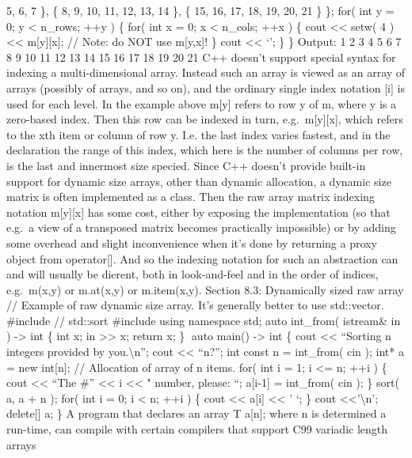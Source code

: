 5, 6, 7 \}, \{ 8, 9, 10, 11, 12, 13, 14 \}, \{ 15, 16, 17, 18, 19, 20,
21 \} \}; for( int y = 0; y \textless{} n\_rows; ++y ) \{ for( int x =
0; x \textless{} n\_cols; ++x ) \{ cout \textless\textless{} setw( 4 )
\textless\textless{} m{[}y{]}{[}x{]}; // Note: do NOT use m{[}y,x{]}! \}
cout \textless\textless{} `\n'; \} \} Output: 1 2 3 4 5 6 7 8 9 10 11 12
13 14 15 16 17 18 19 20 21 C++ doesn't support special syntax for
indexing a multi-dimensional array. Instead such an array is viewed as
an array of arrays (possibly of arrays, and so on), and the ordinary
single index notation {[}i{]} is used for each level. In the example
above m{[}y{]} refers to row y of m, where y is a zero-based index. Then
this row can be indexed in turn, e.g.~m{[}y{]}{[}x{]}, which refers to
the xth item or column of row y. I.e. the last index varies fastest, and
in the declaration the range of this index, which here is the number of
columns per row, is the last and innermost size specied. Since C++
doesn't provide built-in support for dynamic size arrays, other than
dynamic allocation, a dynamic size matrix is often implemented as a
class. Then the raw array matrix indexing notation m{[}y{]}{[}x{]} has
some cost, either by exposing the implementation (so that e.g.~a view of
a transposed matrix becomes practically impossible) or by adding some
overhead and slight inconvenience when it's done by returning a proxy
object from operator{[}{]}. And so the indexing notation for such an
abstraction can and will usually be dierent, both in look-and-feel and
in the order of indices, e.g.~m(x,y) or m.at(x,y) or m.item(x,y).
Section 8.3: Dynamically sized raw array // Example of raw dynamic size
array. It's generally better to use std::vector. \#include // std::sort
\#include using namespace std; auto int\_from( istream\& in )
-\textgreater{} int \{ int x; in \textgreater\textgreater{} x; return x;
\} auto main() -\textgreater{} int \{ cout \textless\textless{}
``Sorting n integers provided by you.\textbackslash n''; cout
\textless\textless{} ``n?''; int const n = int\_from( cin ); int* a =
new int{[}n{]}; // Allocation of array of n items. for( int i = 1; i
\textless= n; ++i ) \{ cout \textless\textless{} ``The \#''
\textless\textless{} i \textless\textless{} " number, please: ``;
a{[}i-1{]} = int\_from( cin ); \} sort( a, a + n ); for( int i = 0; i
\textless{} n; ++i ) \{ cout \textless\textless{} a{[}i{]}
\textless\textless{} ' `; \} cout
\textless\textless{}'\textbackslash n'; delete{[}{]} a; \} A program
that declares an array T a{[}n{]}; where n is determined a run-time, can
compile with certain compilers that support C99 variadic length arrays
